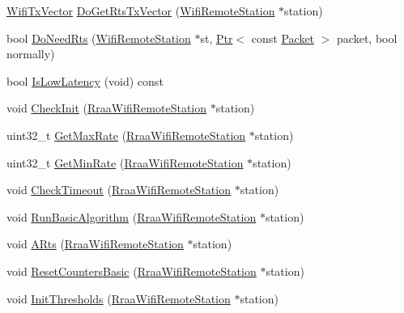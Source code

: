 \begin{DoxyCompactItemize}
\item 
\hyperlink{classns3_1_1WifiTxVector}{Wifi\+Tx\+Vector} \hyperlink{classns3_1_1RraaWifiManager_a68148d81b6e49676837ec93f43f6f005}{Do\+Get\+Rts\+Tx\+Vector} (\hyperlink{structns3_1_1WifiRemoteStation}{Wifi\+Remote\+Station} $\ast$station)
\item 
bool \hyperlink{classns3_1_1RraaWifiManager_a247d7c5c2e63723a464dde8755d703ea}{Do\+Need\+Rts} (\hyperlink{structns3_1_1WifiRemoteStation}{Wifi\+Remote\+Station} $\ast$st, \hyperlink{classns3_1_1Ptr}{Ptr}$<$ const \hyperlink{classns3_1_1Packet}{Packet} $>$ packet, bool normally)
\item 
bool \hyperlink{classns3_1_1RraaWifiManager_a38ae1d075f2b40d1f871ad771f2e791a}{Is\+Low\+Latency} (void) const 
\item 
void \hyperlink{classns3_1_1RraaWifiManager_a14709913f823ce57563d4672a877d4c5}{Check\+Init} (\hyperlink{structns3_1_1RraaWifiRemoteStation}{Rraa\+Wifi\+Remote\+Station} $\ast$station)
\item 
uint32\+\_\+t \hyperlink{classns3_1_1RraaWifiManager_af0c214d4b6b03596b42039d12785e231}{Get\+Max\+Rate} (\hyperlink{structns3_1_1RraaWifiRemoteStation}{Rraa\+Wifi\+Remote\+Station} $\ast$station)
\item 
uint32\+\_\+t \hyperlink{classns3_1_1RraaWifiManager_a1c24b013bb2436ddb1d4ee5470dd1061}{Get\+Min\+Rate} (\hyperlink{structns3_1_1RraaWifiRemoteStation}{Rraa\+Wifi\+Remote\+Station} $\ast$station)
\item 
void \hyperlink{classns3_1_1RraaWifiManager_aa5b366b7ffff6c117be41cf224f0f9a5}{Check\+Timeout} (\hyperlink{structns3_1_1RraaWifiRemoteStation}{Rraa\+Wifi\+Remote\+Station} $\ast$station)
\item 
void \hyperlink{classns3_1_1RraaWifiManager_a722a3688ee61a2a513165f182cdcf967}{Run\+Basic\+Algorithm} (\hyperlink{structns3_1_1RraaWifiRemoteStation}{Rraa\+Wifi\+Remote\+Station} $\ast$station)
\item 
void \hyperlink{classns3_1_1RraaWifiManager_a0f91bc6de4af422cf60e34f17ef69418}{A\+Rts} (\hyperlink{structns3_1_1RraaWifiRemoteStation}{Rraa\+Wifi\+Remote\+Station} $\ast$station)
\item 
void \hyperlink{classns3_1_1RraaWifiManager_a832f82bf443fafae6b13ddbd5990d1f9}{Reset\+Counters\+Basic} (\hyperlink{structns3_1_1RraaWifiRemoteStation}{Rraa\+Wifi\+Remote\+Station} $\ast$station)
\item 
void \hyperlink{classns3_1_1RraaWifiManager_ae8af3b3a155a31631039be3559ca9271}{Init\+Thresholds} (\hyperlink{structns3_1_1RraaWifiRemoteStation}{Rraa\+Wifi\+Remote\+Station} $\ast$station)

\end{DoxyCompactItemize}

